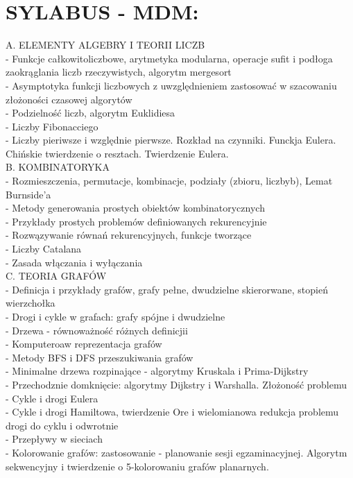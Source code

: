 \documentclass{article}[13pt]
\begin{document}
\newpage

\section*{SYLABUS - MDM:}
\indent A. ELEMENTY ALGEBRY I TEORII LICZB\medskip\\
\indent\indent - Funkcje całkowitoliczbowe, arytmetyka modularna, operacje sufit i podłoga zaokrąglania liczb rzeczywistych, algorytm mergesort\\
\indent\indent - Asymptotyka funkcji liczbowych z uwzględnieniem zastosować w szacowaniu złożoności czasowej algorytów\\
\indent\indent - Podzielność liczb, algorytm Euklidiesa\\
\indent\indent - Liczby Fibonacciego\\
\indent\indent - Liczby pieriwsze i względnie pierwsze. Rozkład na czynniki. Funckja Eulera. Chińskie twierdzenie o resztach. Twierdzenie Eulera.\bigskip\\
\indent B. KOMBINATORYKA\medskip\\
\indent\indent - Rozmieszczenia, permutacje, kombinacje, podziały (zbioru, liczbyb), Lemat Burnside'a\\
\indent\indent - Metody generowania prostych obiektów kombinatorycznych\\
\indent\indent - Przykłady prostych problemów definiowanych rekurencyjnie\\
\indent\indent - Rozwązywanie równań rekurencyjnych, funkcje tworzące\\
\indent\indent - Liczby Catalana\\
\indent\indent - Zasada włączania i wyłączania\bigskip\\
\indent C. TEORIA GRAFÓW\medskip\\
\indent\indent - Definicja i przykłady grafów, grafy pełne, dwudzielne skierorwane, stopień wierzchołka\\
\indent\indent - Drogi i cykle w grafach: grafy spójne i dwudzielne\\
\indent\indent - Drzewa - równoważność różnych definicjii\\
\indent\indent - Komputeroaw reprezentacja grafów\\
\indent\indent - Metody BFS i DFS przeszukiwania grafów\\
\indent\indent - Minimalne drzewa rozpinające - algorytmy Kruskala i Prima-Dijkstry\\
\indent\indent - Przechodznie domknięcie: algorytmy Dijkstry i Warshalla. Złożoność problemu\\
\indent\indent - Cykle i drogi Eulera\\
\indent\indent - Cykle i drogi Hamiltowa, twierdzenie Ore i wielomianowa redukcja problemu drogi do cyklu i odwrotnie\\
\indent\indent - Przepływy w sieciach\\
\indent\indent - Kolorowanie grafów: zastosowanie - planowanie sesji egzaminacyjnej. Algorytm sekwencyjny i twierdzenie o 5-kolorowaniu grafów planarnych.
\end{document}
